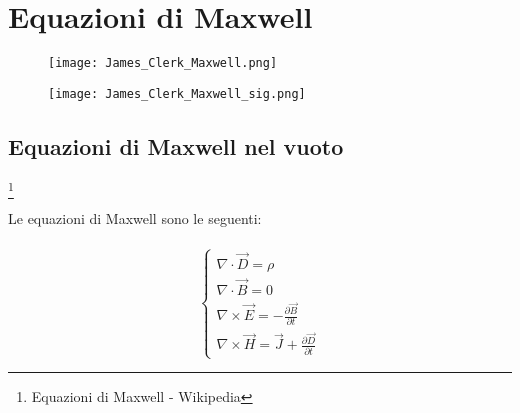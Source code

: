 \chapter{Equazioni di Maxwell} 

\begin{figure}[h]
    \centering
    \texttt{[image: James\_Clerk\_Maxwell.png]}
    
\end{figure}

\begin{figure}[h]
    \centering     
    \texttt{[image: James\_Clerk\_Maxwell\_sig.png]}
    
\end{figure}

\newpage 


\section{Equazioni di Maxwell nel vuoto} 

\footnote{Equazioni di Maxwell - Wikipedia}

Le equazioni di Maxwell sono le seguenti: \\ \\ 

{ \Large \begin{equation}
    \begin{cases}
        
\nabla \cdot \vec{D} = \rho \\ 

\nabla \cdot \vec{B} = 0 \\ 

\nabla \times \vec{E} = -\frac{\partial \vec{B}}{\partial t} \\

\nabla \times \vec{H} = \vec{J} + \frac{\partial \vec{D}}{\partial t}

    \end{cases}
\end{equation}}

